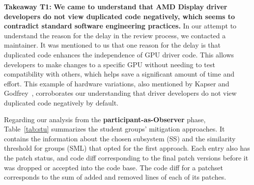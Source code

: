 \documentclass[10pt,conference]{IEEEtran}
\begin{document}
\noindent\textbf{Takeaway T1:}
\textbf{We came to understand that AMD Display driver developers do not view duplicated code negatively, 
which seems to contradict standard software engineering practices.} 
In our attempt to understand the reason for the delay in the review process, 
we contacted a maintainer. It was mentioned to us that one reason for the delay 
is that duplicated code enhances the independence of GPU driver code. This allows 
developers to make changes to a specific GPU without needing to test compatibility 
with others, which helps save a significant amount of time and effort. This example of 
hardware variations, also mentioned by Kapser and Godfrey~\cite{cloneharm}, 
corroborates our understanding that driver developers do not view duplicated code negatively by default.

Regarding our analysis from the \textbf{participant-as-Observer} phase, Table~\ref{tab:stu} summarizes the student groups' mitigation approaches. It contains the information about the chosen subsystem (SS) and the similarity threshold for groups (SML) that opted for the first approach. Each entry also has the patch status, and code diff corresponding to the final patch versions before it was dropped or accepted into the code base. The code diff for a patchset corresponds to the sum of added and removed lines of each of its patches.
\end{document}
